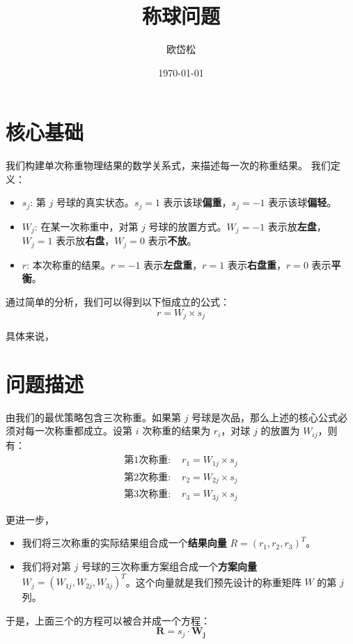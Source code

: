 \documentclass[12pt, a4paper]{ctexart}
\title{称球问题}
\author{欧岱松}
\date{\today}
\begin{document}
\maketitle

\section{核心基础}

我们构建单次称重物理结果的数学关系式，来描述每一次的称重结果。
我们定义：
\begin{itemize}
    \item $s_j$: 第 $j$ 号球的真实状态。$s_j=1$ 表示该球\textbf{偏重}，$s_j=-1$ 表示该球\textbf{偏轻}。
    \item $W_j$: 在某一次称重中，对第 $j$ 号球的放置方式。$W_j=-1$ 表示放\textbf{左盘}，$W_j=1$ 表示放\textbf{右盘}，$W_j=0$ 表示\textbf{不放}。
    \item $r$: 本次称重的结果。$r=-1$ 表示\textbf{左盘重}，$r=1$ 表示\textbf{右盘重}，$r=0$ 表示\textbf{平衡}。
\end{itemize}
通过简单的分析，我们可以得到以下恒成立的公式：
\begin{equation}
    r = W_j \times s_j
\end{equation}

具体来说，

\section{问题描述}

由我们的最优策略包含三次称重。如果第 $j$ 号球是次品，那么上述的核心公式必须对每一次称重都成立。设第 $i$ 次称重的结果为 $r_i$，对球 $j$ 的放置为 $W_{ij}$，则有：
\begin{align*}
    \text{第1次称重: } & r_1 = W_{1j} \times s_j \\
    \text{第2次称重: } & r_2 = W_{2j} \times s_j \\
    \text{第3次称重: } & r_3 = W_{3j} \times s_j
\end{align*}

更进一步，
\begin{itemize}
    \item 我们将三次称重的实际结果组合成一个\textbf{结果向量} $R = (r_1, r_2, r_3)^T$。
    \item 我们将对第 $j$ 号球的三次称重方案组合成一个\textbf{方案向量} $W_j = (W_{1j}, W_{2j}, W_{3j})^T$。这个向量就是我们预先设计的称重矩阵 $W$ 的第 $j$ 列。
\end{itemize}
于是，上面三个的方程可以被合并成一个方程：
\begin{equation}
    \mathbf{R} = s_j \cdot \mathbf{W_j}
\end{equation}
\end{document}
